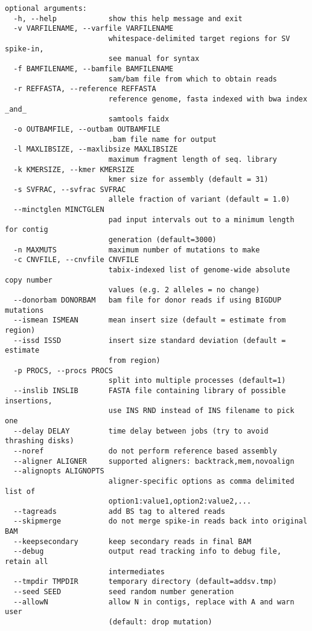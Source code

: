 \documentclass[letterpaper,11pt]{article}
\begin{document}
\begin{verbatim}
optional arguments:
  -h, --help            show this help message and exit
  -v VARFILENAME, --varfile VARFILENAME
                        whitespace-delimited target regions for SV spike-in,
                        see manual for syntax
  -f BAMFILENAME, --bamfile BAMFILENAME
                        sam/bam file from which to obtain reads
  -r REFFASTA, --reference REFFASTA
                        reference genome, fasta indexed with bwa index _and_
                        samtools faidx
  -o OUTBAMFILE, --outbam OUTBAMFILE
                        .bam file name for output
  -l MAXLIBSIZE, --maxlibsize MAXLIBSIZE
                        maximum fragment length of seq. library
  -k KMERSIZE, --kmer KMERSIZE
                        kmer size for assembly (default = 31)
  -s SVFRAC, --svfrac SVFRAC
                        allele fraction of variant (default = 1.0)
  --minctglen MINCTGLEN
                        pad input intervals out to a minimum length for contig
                        generation (default=3000)
  -n MAXMUTS            maximum number of mutations to make
  -c CNVFILE, --cnvfile CNVFILE
                        tabix-indexed list of genome-wide absolute copy number
                        values (e.g. 2 alleles = no change)
  --donorbam DONORBAM   bam file for donor reads if using BIGDUP mutations
  --ismean ISMEAN       mean insert size (default = estimate from region)
  --issd ISSD           insert size standard deviation (default = estimate
                        from region)
  -p PROCS, --procs PROCS
                        split into multiple processes (default=1)
  --inslib INSLIB       FASTA file containing library of possible insertions,
                        use INS RND instead of INS filename to pick one
  --delay DELAY         time delay between jobs (try to avoid thrashing disks)
  --noref               do not perform reference based assembly
  --aligner ALIGNER     supported aligners: backtrack,mem,novoalign
  --alignopts ALIGNOPTS
                        aligner-specific options as comma delimited list of
                        option1:value1,option2:value2,...
  --tagreads            add BS tag to altered reads
  --skipmerge           do not merge spike-in reads back into original BAM
  --keepsecondary       keep secondary reads in final BAM
  --debug               output read tracking info to debug file, retain all
                        intermediates
  --tmpdir TMPDIR       temporary directory (default=addsv.tmp)
  --seed SEED           seed random number generation
  --allowN              allow N in contigs, replace with A and warn user
                        (default: drop mutation)
  
\end{verbatim}
\end{document}
